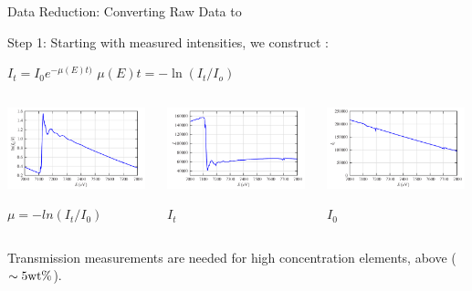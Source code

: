 \begin{slide}{Data Reduction: Converting Raw Data to  {\mue}  }

  \begin{cenpage}{145mm}
    Step 1:   Starting with measured intensities,  we construct {\mue}:

    \vmm\vmm

    {     {
    {}   $ I_t = I_0 e^{-\mu(E)t)}  $  \hspace{10mm}  $ \mu(E)t =  - \ln(I_t/I_o)  $

    \vmm
    \begin{columns}
      \begin{column}{40mm}
        \includegraphics[width=40mm]{figs/experiment/mu}

        \hspace{15mm}        $\mu = -ln(I_t/I_0)$
      \end{column}
      \begin{column}{40mm}
        \includegraphics[width=40mm]{figs/experiment/i1}

        \hspace{15mm}        $I_t$
      \end{column}
      \begin{column}{40mm}
        \includegraphics[width=40mm]{figs/experiment/i0}

        \hspace{15mm}        $I_0$
       \end{column}
     \end{columns}

     \vmm

  Transmission measurements are needed for high concentration elements, above
  ($\sim 5 {\rm wt \%}$).



}}
\end{cenpage}
\end{slide}
